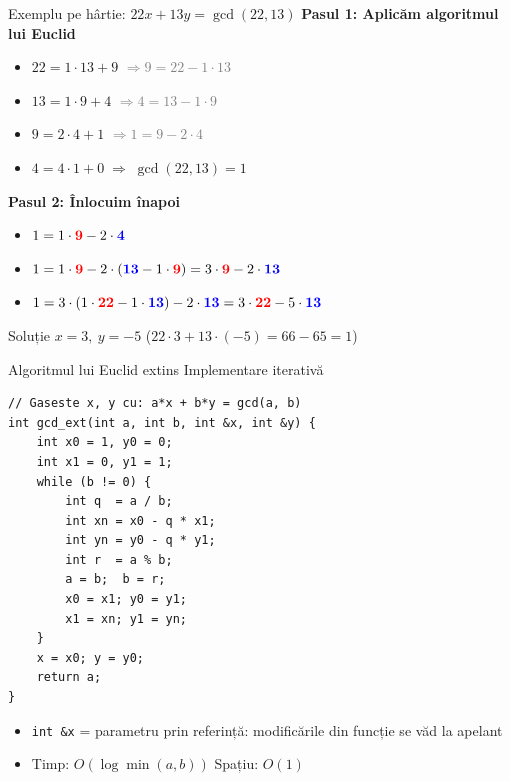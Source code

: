 ﻿\documentclass{beamer}
\newcommand{\bred}[1]{\textbf{\textcolor{red}{#1}}}
\newcommand{\bblu}[1]{\textbf{\textcolor{blue}{#1}}}
\begin{document}
\begin{frame}[shrink]{Exemplu pe hârtie: $22x + 13y = \gcd(22, 13)$}
  \textbf{Pasul 1: Aplicăm algoritmul lui Euclid}
  \begin{itemize}
    \item $22 = 1 \cdot 13 + 9$ \hfill {\footnotesize\textcolor{gray}{$\Rightarrow 9 = 22 - 1 \cdot 13$}}
    \item $13 = 1 \cdot 9 + 4$ \hfill {\footnotesize\textcolor{gray}{$\Rightarrow 4 = 13 - 1 \cdot 9$}}
    \item $9 = 2 \cdot 4 + 1$ \hfill {\footnotesize\textcolor{gray}{$\Rightarrow 1 = 9 - 2 \cdot 4$}}
    \item $4 = 4 \cdot 1 + 0 \;\Rightarrow\; \gcd(22, 13) = 1$
  \end{itemize}

  \bigskip
  \textbf{Pasul 2: Înlocuim înapoi}
  \begin{itemize}
    \item $1 = 1 \cdot \bred{9} - 2 \cdot \bblu{4}$
    \item $1 = 1 \cdot \bred{9} - 2 \cdot (\bblu{13} - 1 \cdot \bred{9}) = 3 \cdot \bred{9} - 2 \cdot \bblu{13}$
    \item $1 = 3 \cdot (1 \cdot \bred{22} - 1 \cdot \bblu{13}) - 2 \cdot \bblu{13} = 3 \cdot \bred{22} - 5 \cdot \bblu{13}$
  \end{itemize}
  \bigskip
  \begin{block}{Soluție}
    $x = 3,\ y = -5$ \quad \checkmark \quad ($22 \cdot 3 + 13 \cdot (-5) = 66 - 65 = 1$)
  \end{block}
\end{frame}

\begin{frame}{Algoritmul lui Euclid extins \textemdash{} Implementare iterativă}
  \begin{center}
  \begin{lstlisting}
// Gaseste x, y cu: a*x + b*y = gcd(a, b)
int gcd_ext(int a, int b, int &x, int &y) {
    int x0 = 1, y0 = 0;
    int x1 = 0, y1 = 1;
    while (b != 0) {
        int q  = a / b;
        int xn = x0 - q * x1;
        int yn = y0 - q * y1;
        int r  = a % b;
        a = b;  b = r;
        x0 = x1; y0 = y1;
        x1 = xn; y1 = yn;
    }
    x = x0; y = y0;
    return a;
}
  \end{lstlisting}
  \end{center}
  \begin{itemize}
    \item \lstinline|int &x| = parametru prin referință: modificările din funcție se văd la apelant
    \item Timp: $O(\log \min(a, b))$ \quad Spațiu: $O(1)$
  \end{itemize}
\end{frame}
\end{document}
